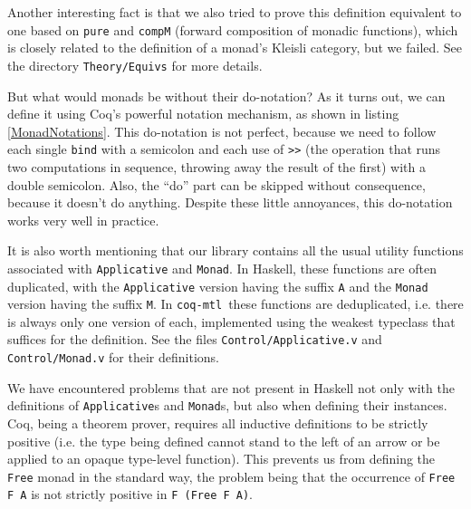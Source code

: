 \documentclass[declaration,inz,english,shortabstract]{iithesis}
\newcommand{\libname}{\m{coq-mtl}}
\newcommand{\m}[1]{\texttt{#1}}
\begin{document}
Another interesting fact is that we also tried to prove this definition equivalent to one based on \m{pure} and \m{compM} (forward composition of monadic functions), which is closely related to the definition of a monad's Kleisli category, but we failed. See the directory \m{Theory/Equivs} for more details.


But what would monads be without their do-notation? As it turns out, we can define it using Coq's powerful notation mechanism, as shown in listing \ref{MonadNotations}. This do-notation is not perfect, because we need to follow each single \m{bind} with a semicolon and each use of \m{>>} (the operation that runs two computations in sequence, throwing away the result of the first) with a double semicolon. Also, the ``do'' part can be skipped without consequence, because it doesn't do anything. Despite these little annoyances, this do-notation works very well in practice.

It is also worth mentioning that our library contains all the usual utility functions associated with \m{Applicative} and \m{Monad}. In Haskell, these functions are often duplicated, with the \m{Applicative} version having the suffix \m{A} and the \m{Monad} version having the suffix \m{M}. In \libname\ these functions are deduplicated, i.e. there is always only one version of each, implemented using the weakest typeclass that suffices for the definition. See the files \m{Control/Applicative.v} and \m{Control/Monad.v} for their definitions.


We have encountered problems that are not present in Haskell not only with the definitions of \m{Applicative}s and \m{Monad}s, but also when defining their instances. Coq, being a theorem prover, requires all inductive definitions to be strictly positive (i.e. the type being defined cannot stand to the left of an arrow or be applied to an opaque type-level function). This prevents us from defining the \m{Free} monad in the standard way, the problem being that the occurrence of \m{Free F A} is not strictly positive in \m{F (Free F A)}.
\end{document}
